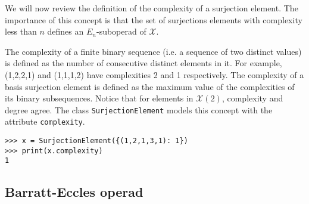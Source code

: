 \documentclass{amsart}
\begin{document}
We will now review the definition of the complexity of a surjection element. The importance of this concept is that the set of surjections elements with complexity less than $n$ defines an $E_n$-suboperad of $\mathcal X$.

The complexity of a finite binary sequence (i.e. a sequence of two distinct values) is defined as the number of consecutive distinct elements in it. For example, (1,2,2,1) and (1,1,1,2) have complexities 2 and 1 respectively. The complexity of a basis surjection element is defined as the maximum value of the complexities of its binary subsequences. Notice that for elements in $\mathcal X(2)$, complexity and degree agree. The class \texttt{SurjectionElement} models this concept with the attribute \texttt{complexity}.

\begin{verbatim}
>>> x = SurjectionElement({(1,2,1,3,1): 1})
>>> print(x.complexity)
1
\end{verbatim}

\subsection{Barratt-Eccles operad}
\end{document}
